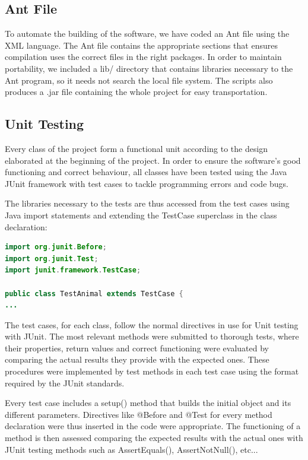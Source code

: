 \documentclass[11pt]{report}
\begin{document}
      
      \subsection{Ant File} %
To automate the building of the software, we have coded an Ant file using the XML language. The Ant file contains the appropriate sections that ensures compilation uses the correct files in the right packages. In order to maintain portability, we included a lib/ directory that contains libraries necessary to the Ant program, so it needs not search the local file system. The scripts also produces a .jar file containing the whole project for easy transportation.  
 
      \subsection{Unit Testing} %
      Every class of the project form a functional unit according to the design elaborated at the beginning of the project. In order to ensure the software's good functioning and correct behaviour, all classes have been tested using the Java JUnit framework with test cases to tackle programming errors and code bugs.

The libraries necessary to the tests are thus accessed from the test cases using Java import statements and extending the TestCase superclass in the class declaration:
\begin{lstlisting}[language=Java,caption= Test case headers]
import org.junit.Before;
import org.junit.Test;
import junit.framework.TestCase;

public class TestAnimal extends TestCase {
...
\end{lstlisting}

The test cases, for each class, follow the normal directives in use for Unit testing with JUnit. The most relevant methods were submitted to thorough tests, where their properties, return values and correct functioning were evaluated by comparing the actual results they provide with the expected ones. These procedures were implemented by test methods in each test case using the format required by the JUnit standards. 

Every test case includes a setup() method that builds the initial object and its different parameters. Directives like @Before and @Test for every method declaration were thus inserted in the code were appropriate. The functioning of a method is then assessed comparing the expected results with the actual ones with JUnit testing methods such as AssertEquals(), AssertNotNull(), etc...
\end{document}
